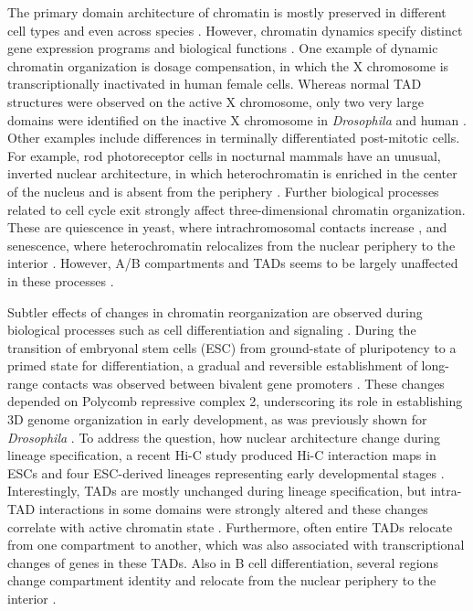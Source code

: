 \documentclass[a4paper,twoside=true,openright,parskip=full,chapterprefix=true,11pt,headings=normal,bibliography=totoc,listof=totoc,titlepage=on,captions=tableabove,draft=false]{scrreprt}
\theoremstyle{definition}
\theoremstyle{definition}
\theoremstyle{definition}
\theoremstyle{remark}
\begin{document}
The primary domain architecture of chromatin is mostly preserved in
different cell types and even across species \citep{Dixon2012, Rao2014}.
However, chromatin dynamics specify distinct gene expression programs
and biological functions \citep{Bonev2016}. One example of dynamic
chromatin organization is dosage compensation, in which the X chromosome
is transcriptionally inactivated in human female cells. Whereas normal
TAD structures were observed on the active X chromosome, only two very
large domains were identified on the inactive X chromosome in
\emph{Drosophila} and human \citep{Deng2015, Rao2014}. Other examples
include differences in terminally differentiated post-mitotic cells. For
example, rod photoreceptor cells in nocturnal mammals have an unusual,
inverted nuclear architecture, in which heterochromatin is enriched in
the center of the nucleus and is absent from the periphery
\citep{Solovei2013}. Further biological processes related to cell cycle
exit strongly affect three-dimensional chromatin organization. These are
quiescence in yeast, where intrachromosomal contacts increase
\citep{Rutledge2015}, and senescence, where heterochromatin relocalizes
from the nuclear periphery to the interior \citep{Chandra2015}. However,
A/B compartments and TADs seems to be largely unaffected in these
processes \citep{Criscione2016}.

Subtler effects of changes in chromatin reorganization are observed
during biological processes such as cell differentiation and signaling
\citep{Bonev2016}. During the transition of embryonal stem cells (ESC)
from ground-state of pluripotency to a primed state for differentiation,
a gradual and reversible establishment of long-range contacts was
observed between bivalent gene promoters \citep{Joshi2015}. These
changes depended on Polycomb repressive complex 2, underscoring its role
in establishing 3D genome organization in early development, as was
previously shown for \emph{Drosophila} \citep{Bantignies2011}. To
address the question, how nuclear architecture change during lineage
specification, a recent Hi-C study produced Hi-C interaction maps in
ESCs and four ESC-derived lineages representing early developmental
stages \citep{Dixon2015}. Interestingly, TADs are mostly unchanged
during lineage specification, but intra-TAD interactions in some domains
were strongly altered and these changes correlate with active chromatin
state \citep{Dixon2015}. Furthermore, often entire TADs relocate from
one compartment to another, which was also associated with
transcriptional changes of genes in these TADs. Also in B cell
differentiation, several regions change compartment identity and
relocate from the nuclear periphery to the interior \citep{Lin2012}.
\end{document}
